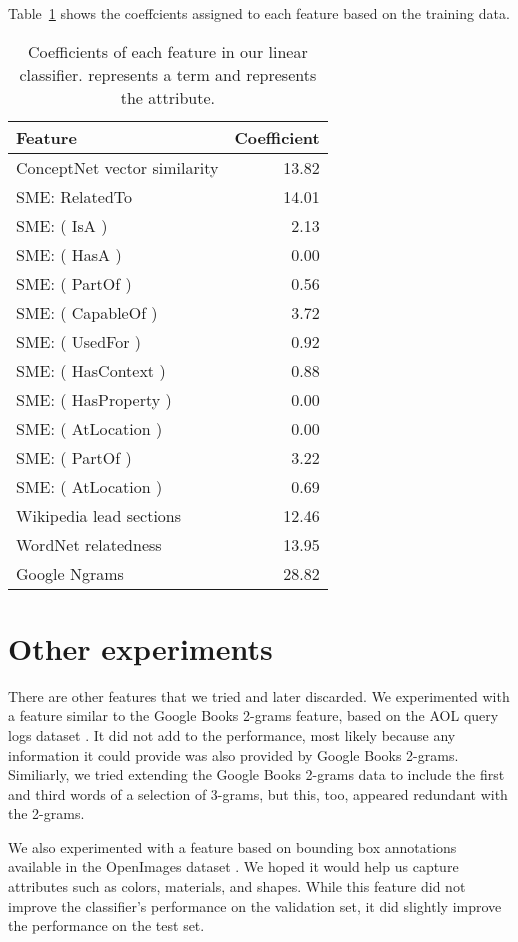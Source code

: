 \documentclass[11pt,a4paper]{article}
\begin{document}
Table~\ref{table:coefficients} shows the coeffcients assigned to each feature
based on the training data.

\begin{table}[t]
\begin{small}
\begin{tabular}{lr}
\textbf{Feature} & \textbf{Coefficient}\\
\hline
ConceptNet vector similarity	& 13.82\\
SME: RelatedTo			& 14.01\\
SME: ( IsA )			& 2.13\\
SME: ( HasA )			& 0.00\\
SME: ( PartOf )		& 0.56\\
SME: ( CapableOf )		& 3.72\\
SME: ( UsedFor )		& 0.92\\
SME: ( HasContext )		& 0.88\\
SME: ( HasProperty )		& 0.00\\
SME: ( AtLocation )		& 0.00\\
SME: ( PartOf )		& 3.22\\
SME: ( AtLocation )		& 0.69\\
Wikipedia lead sections		& 12.46\\
WordNet relatedness		& 13.95\\
Google Ngrams			& 28.82\\
\end{tabular}
\end{small}
\caption{Coefficients of each feature in our linear classifier.
     represents a term and  represents the attribute.}
\label{table:coefficients}
\end{table}

\section{Other experiments}

\label{sec:experiments}
There are other features that we tried and later discarded. We experimented
with a feature similar to the Google Books 2-grams feature, based on the AOL
query logs dataset \cite{pass2006}. It did not add to the performance, most
likely because any information it could provide was also provided by Google
Books 2-grams. Similiarly, we tried extending the Google Books 2-grams data to
include the first and third words of a selection of 3-grams, but this, too,
appeared redundant with the 2-grams.

We also experimented with a feature based on bounding box annotations available
in the OpenImages dataset \cite{openimages}. We hoped it would help us capture
attributes such as colors, materials, and shapes. While this feature did not
improve the classifier's performance on the validation set, it did slightly
improve the performance on the test set.
\end{document}
